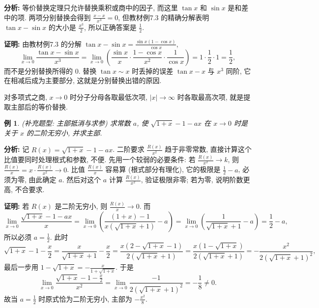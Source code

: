 \documentclass[UTF8,openany]{ctexbook}
\theoremstyle{chinesetextbook}
\newtheorem{example}{例}[section]
\newenvironment{cnproof}{\par\indent\textbf{证明:} \ignorespaces}{\par}
\begin{document}
\par\indent\textbf{分析:} 等价替换定理只允许替换乘积或商中的因子, 而这里 $\tan x$ 和 $\sin x$ 是和差中的项. 两项分别替换会得到 $\displaystyle\frac{x-x}{x^3}=0$, 但教材例7.3 的精确分解表明 $\tan x-\sin x$ 的大小是 $\displaystyle\frac{x^3}2$, 所以正确答案是 $\displaystyle\frac12$.
\begin{cnproof}
由教材例7.3 的分解 $\displaystyle\tan x-\sin x=\frac{\sin x(1-\cos x)}{\cos x}$,
\[
\lim_{x\to0}\frac{\tan x-\sin x}{x^3}
=\lim_{x\to0}\left(\frac{\sin x}x\cdot\frac{1-\cos x}{x^2}\cdot\frac1{\cos x}\right)=1\cdot\frac12\cdot1=\frac12,
\]
而不是分别替换所得的 $0$. 替换 $\tan x\sim x$ 时丢掉的误差 $\tan x-x$ 与 $x^3$ 同阶, 它在相减后成为主要部分, 这就是分别替换出错的原因.
\end{cnproof}
对多项式之商, $x\to0$ 时分子分母各取最低次项, $|x|\to\infty$ 时各取最高次项, 就是提取主部后的等价替换.
\begin{example}
\textnormal{(补充题型: 主部抵消与求参)} 求常数 $a$, 使 $\sqrt{1+x}-1-ax$ 在 $x\to0$ 时是关于 $x$ 的二阶无穷小, 并求主部.
\end{example}
\par\indent\textbf{分析:} 记 $R(x)=\sqrt{1+x}-1-ax$. 二阶要求 $\displaystyle\frac{R(x)}{x^2}$ 趋于非零常数, 直接计算这个比值要同时处理根式和参数, 不便. 先用一个较弱的必要条件: 若 $\displaystyle\frac{R(x)}{x^2}\to k$, 则 $\displaystyle\frac{R(x)}x=x\cdot\frac{R(x)}{x^2}\to0$. 比值 $\displaystyle\frac{R(x)}x$ 容易算 (根式部分有理化), 它的极限是 $\displaystyle\frac12-a$, 必须为零, 由此确定 $a$. 然后对这个 $a$ 计算 $\displaystyle\frac{R(x)}{x^2}$, 验证极限非零; 若为零, 说明阶数更高, 不合要求.
\begin{cnproof}
若 $R(x)$ 是二阶无穷小, 则 $\displaystyle\frac{R(x)}x\to0$. 而
\[
\lim_{x\to0}\frac{\sqrt{1+x}-1-ax}{x}
=\lim_{x\to0}\left(\frac{(1+x)-1}{x\left(\sqrt{1+x}+1\right)}-a\right)
=\lim_{x\to0}\left(\frac1{\sqrt{1+x}+1}-a\right)=\frac12-a,
\]
所以必须 $\displaystyle a=\frac12$. 此时
\[
\sqrt{1+x}-1-\frac x2
=\frac{x}{\sqrt{1+x}+1}-\frac x2
=\frac{x\left(2-\sqrt{1+x}-1\right)}{2\left(\sqrt{1+x}+1\right)}
=\frac{x\left(1-\sqrt{1+x}\right)}{2\left(\sqrt{1+x}+1\right)}
=-\frac{x^2}{2\left(\sqrt{1+x}+1\right)^2},
\]
最后一步用 $\displaystyle1-\sqrt{1+x}=-\frac{x}{1+\sqrt{1+x}}$. 于是
\[
\lim_{x\to0}\frac{\sqrt{1+x}-1-\frac x2}{x^2}
=\lim_{x\to0}\frac{-1}{2\left(\sqrt{1+x}+1\right)^2}=-\frac18\ne0.
\]
故当 $\displaystyle a=\frac12$ 时原式恰为二阶无穷小, 主部为 $\displaystyle-\frac{x^2}8$.
\end{cnproof}
\end{document}
